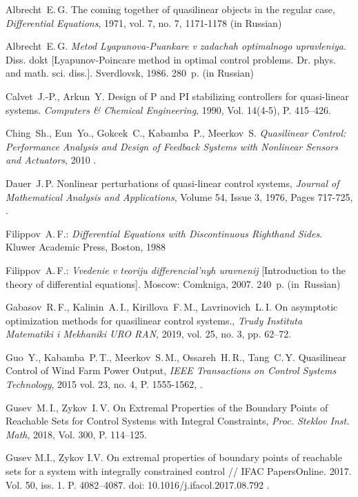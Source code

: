 \documentclass[../main.tex]{subfiles}
\begin{document}
\begin{thebibliography}{99}
Albrecht~E.\,G. The coming together of quasilinear objects in the regular case, \emph{Differential Equations}, 1971, vol. 7, no. 7, 1171-1178 (in Russian)

Albrecht~E.\,G. \emph{Metod Lyapunova-Puankare v zadachah optimalnogo upravleniya}. Diss.
dokt [Lyapunov-Poincare method in optimal control problems. Dr. phys. and math. sci. diss.].
Sverdlovsk, 1986. 280~p. (in Russian)

Calvet~J.-P., Arkun~Y. Design of P and PI stabilizing controllers for quasi-linear systems. \emph{Computers \& Chemical Engineering}, 1990, Vol. 14(4-5), P. 415–426. 

Ching~Sh., Eun~Yo., Gokcek~C., Kabamba~P., Meerkov~S. \emph{Quasilinear Control: Performance Analysis and Design of Feedback Systems with Nonlinear Sensors and Actuators}, 2010 . 

Dauer~J.\,P. Nonlinear perturbations of quasi-linear control systems,
\emph{Journal of Mathematical Analysis and Applications},
Volume 54, Issue 3,
1976,
Pages 717-725,
.

Filippov~A.\,F.: \emph{Differential Equations with Discontinuous Righthand Sides}. Kluwer Academic Press, Boston, 1988

Filippov~A.\,F.: \emph{Vvedenie v teoriju differencial'nyh uravnenij} [Introduction to the theory of differential equations]. Moscow: Comkniga, 2007. 240~p. (in~Russian)

Gabasov~R.\,F., Kalinin~A.\,I.,  Kirillova~F.\,M., Lavrinovich~L.\,I. On asymptotic optimization methods for quasilinear control systems., \emph{Trudy Instituta Matematiki i Mekhaniki URO
    RAN}, 2019, vol. 25, no. 3, pp. 62–72.

Guo~Y., Kabamba~P.\,T., Meerkov~S.\,M.,  Ossareh~H.\,R., Tang~C.\,Y. Quasilinear Control of Wind Farm Power Output, \emph{IEEE Transactions on Control Systems Technology}, 2015 vol. 23, no. 4, P. 1555-1562,  .


Gusev~M.\,I., Zykov~I.\,V. On Extremal Properties of the Boundary Points of Reachable Sets for Control Systems with Integral Constraints, \emph{Proc. Steklov Inst. Math}, 2018, Vol. 300, P. 114--125. 

Gusev M.I., Zykov I.V. On extremal properties of boundary points of reachable sets for a system
with integrally constrained control // IFAC PapersOnline. 2017. Vol. 50, iss. 1. P. 4082–4087. doi:
10.1016/j.ifacol.2017.08.792 .


\end{thebibliography}
\end{document}
